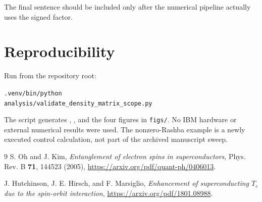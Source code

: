 \documentclass[11pt]{article}
\begin{document}
The final sentence should be included only after the numerical pipeline actually uses the signed factor.

\section{Reproducibility}

Run from the repository root:
\begin{center}
\texttt{.venv/bin/python}\\
\texttt{analysis/validate\_density\_matrix\_scope.py}
\end{center}
The script generates , , and the four figures in \texttt{figs/}. No IBM hardware or external numerical results were used. The nonzero-Rashba example is a newly executed control calculation, not part of the archived manuscript sweep.

\begin{thebibliography}{9}
S. Oh and J. Kim, \emph{Entanglement of electron spins in superconductors}, Phys. Rev. B \textbf{71}, 144523 (2005), \url{https://arxiv.org/pdf/quant-ph/0406013}.

J. Hutchinson, J. E. Hirsch, and F. Marsiglio, \emph{Enhancement of superconducting $T_c$ due to the spin-orbit interaction}, \url{https://arxiv.org/pdf/1801.08988}.
\end{thebibliography}
\end{document}
